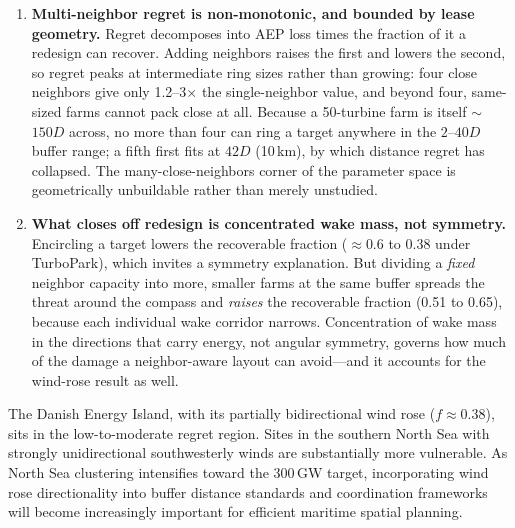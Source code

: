 \documentclass[wes, manuscript]{copernicus}
\begin{document}
\begin{enumerate}
    \item \textbf{Multi-neighbor regret is non-monotonic, and bounded by lease geometry.}
    Regret decomposes into AEP loss times the fraction of it a redesign can recover.
    Adding neighbors raises the first and lowers the second, so regret peaks at intermediate ring sizes rather than growing: four close neighbors give only 1.2--3$\times$ the single-neighbor value, and beyond four, same-sized farms cannot pack close at all.
    Because a 50-turbine farm is itself $\sim$$150D$ across, no more than four can ring a target anywhere in the $2$--$40D$ buffer range; a fifth first fits at $42D$ (10\,km), by which distance regret has collapsed.
    The many-close-neighbors corner of the parameter space is geometrically unbuildable rather than merely unstudied.

    \item \textbf{What closes off redesign is concentrated wake mass, not symmetry.}
    Encircling a target lowers the recoverable fraction ($\approx$0.6 to 0.38 under TurboPark), which invites a symmetry explanation.
    But dividing a \emph{fixed} neighbor capacity into more, smaller farms at the same buffer spreads the threat around the compass and \emph{raises} the recoverable fraction (0.51 to 0.65), because each individual wake corridor narrows.
    Concentration of wake mass in the directions that carry energy, not angular symmetry, governs how much of the damage a neighbor-aware layout can avoid---and it accounts for the wind-rose result as well.
\end{enumerate}

The Danish Energy Island, with its partially bidirectional wind rose ($f \approx 0.38$), sits in the low-to-moderate regret region.
Sites in the southern North Sea with strongly unidirectional southwesterly winds are substantially more vulnerable.
As North Sea clustering intensifies toward the 300\,GW target, incorporating wind rose directionality into buffer distance standards and coordination frameworks will become increasingly important for efficient maritime spatial planning.


\end{document}
